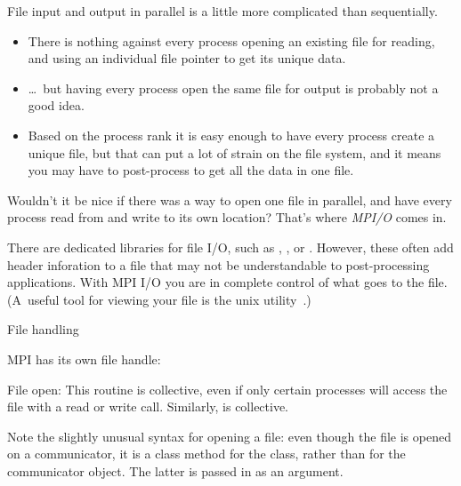 

File input and output in parallel is a little more complicated than
sequentially.
\begin{itemize}
\item There is nothing against every process opening an existing file
  for reading, and using an individual file pointer to get its unique
  data.
\item \ldots~but having every process open the same file for output is
  probably not a good idea.
\item Based on the process rank it is easy enough to have
  every process create a unique file, but that can put a lot of strain
  on the file system, and it means you may have to post-process 
  to get all the data in one file.
\end{itemize}

Wouldn't it be nice if there was a way to open one file in parallel,
and have every process read from and write to its own location? That's
where \emph{MPI/O} comes in.

There are dedicated libraries for file I/O, such as ,
, or . However, these often add
header inforation to a file that may not be understandable to
post-processing applications. With MPI I/O you are in complete control
of what goes to the file. (A~useful tool for viewing your file is the
unix utility~.)

 {File handling}

MPI has its own file handle:

File open:
%
%
This routine is collective, even if only certain processes will access
the file with a read or write call.
Similarly,  is collective.

\begin{pythonnote}
  Note the slightly unusual syntax for opening a file: even though the file is
  opened on a communicator, it is a class method for the 
  class, rather than for the communicator object. The latter is passed
  in as an argument.
\end{pythonnote}


